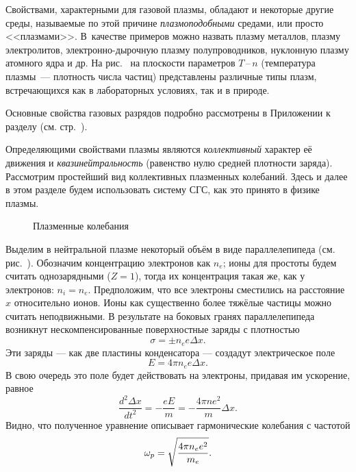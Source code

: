 Свойствами, характерными для газовой плазмы, обладают и некоторые другие среды,
называемые по этой причине \emph{плазмоподобными} средами, или просто <<плазмами>>.
В~качестве примеров можно назвать плазму металлов,
плазму электролитов, электронно-дырочную плазму полупроводников, 
нуклонную плазму атомного ядра и др.
На рис.~ на плоскости параметров
$T$\,--\,$n$ (температура плазмы~--- плотность числа частиц) 
представлены различные типы плазм, встречающихся как в лабораторных условиях,
так и в природе.


Основные свойства газовых разрядов подробно рассмотрены
в Приложении к разделу (см. стр.~\pageref{sec:discharge}).

\label{sec:plasma}

Определяющими свойствами плазмы являются \emph{коллективный} характер её движения
и \emph{квазинейтральность} (равенство нулю средней плотности заряда).
Рассмотрим простейший вид коллективных плазменных колебаний. Здесь и далее
в этом разделе будем использовать систему СГС, как это принято в физике плазмы.


\begin{wrapfigure}{o}{0.45\textwidth}
    \centering
    \caption{Плазменные колебания}
\end{wrapfigure}

Выделим в нейтральной плазме некоторый объём в виде параллелепипеда
(см. рис.~).
Обозначим концентрацию электронов как $n_e$; ионы для простоты будем считать
однозарядными ($Z=1$), тогда их концентрация такая же, как у электронов: $n_i=n_e$.
Предположим, что все электроны сместились на расстояние $x$ относительно ионов.
Ионы как существенно более тяжёлые частицы можно считать неподвижными.
В результате на боковых гранях параллелепипеда возникнут нескомпенсированные
поверхностные заряды с плотностью
\begin{equation*}
    \sigma = \pm n_e e \Delta x.
\end{equation*}
Эти заряды --- как две пластины конденсатора --- создадут электрическое поле
\begin{equation*}
    E=4\pi n_e e \Delta x.
\end{equation*}
В свою очередь это поле будет действовать на электроны,
придавая им ускорение, равное
\begin{equation*}
    \frac{d^2\Delta x}{dt^2}=-\frac{eE}{m}=-\frac{4\pi ne^2}{m} \Delta x.
\end{equation*}
Видно, что полученное уравнение описывает гармонические колебания с частотой
\begin{equation}
    \eqmark{plasma-freq}
    \omega_p=\sqrt{\frac{4\pi n_e e^2}{m_e}}.
\end{equation}

